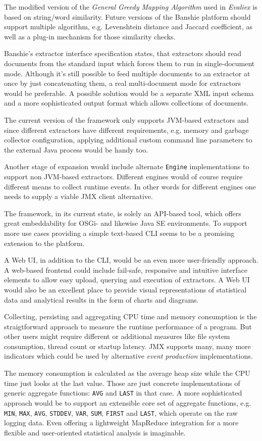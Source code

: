 The modified version of the \textit{General Greedy Mapping Algorithm} used in \textit{Evaliex} is based on string/word similarity. Future versions of the Banshie platform should support multiple algorithm, e.g. Levenshtein distance and Jaccard coefficient, as well as a plug-in mechanism for those similarity checks.

Banshie's extractor interface specification states, that extractors should read documents from the standard input which forces them to run in single-document mode. Although it's still possible to feed multiple documents to an extractor at once by just concatenating them, a real multi-document mode for extractors would be preferable. A possible solution would be a  separate XML input schema and a more sophisticated output format which allows collections of documents.

The current version of the framework only supports \gls{JVM}-based extractors and since different extractors have different requirements, e.g. memory and garbage collector configuration, applying additional custom command line parameters to the external Java process would be handy too.

Another stage of expansion would include alternate \texttt{Engine} implementations to support non \gls{JVM}-based extractors. Different engines would of course require different means to collect runtime events. In other words for different engines one needs to supply a viable \gls{JMX} client alternative.

The framework, in its current state, is solely an \gls{API}-based tool, which offers great embeddability for \gls{OSGi}- and likewise Java SE environments. To support more use cases providing a simple text-based \gls{CLI} seems to be a promising extension to the platform.

A Web \gls{UI}, in addition to the \gls{CLI}, would be an even more user-friendly approach. A web-based frontend could include fail-safe, responsive and intuitive interface elements to allow easy upload, querying and execution of extractors. A Web \gls{UI} would also be an excellent place to provide visual representations of statistical data and analytical results in the form of charts and diagrams.

Collecting, persisting and aggregating CPU time and memory consumption is the straigtforward approach to measure the runtime performance of a program. But other users might require different or additional measures like file system consumption, thread count or startup latency. \gls{JMX} supports many, many more indicators which could be used by alternative \textit{event production} implementations.

The memory consumption is calculated as the average heap size while the CPU time just looks at the last value. Those are just concrete implementations of generic aggregate functions: \texttt{AVG} and \texttt{LAST} in that case. A more sophisticated approach would be to support an extensible core set of aggregate functions, e.g. \texttt{MIN}, \texttt{MAX}, \texttt{AVG}, \texttt{STDDEV}, \texttt{VAR}, \texttt{SUM}, \texttt{FIRST} and \texttt{LAST}, which operate on the raw logging data. Even offering a lightweight MapReduce integration for a more flexible and user-oriented statistical analysis is imaginable.